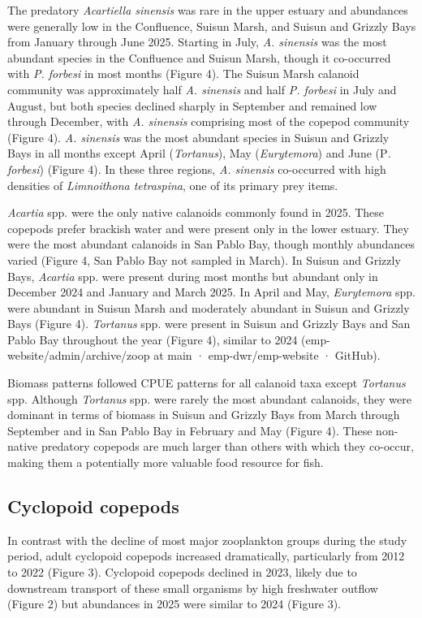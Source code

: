 \documentclass[
  letterpaper,
]{article}
\begin{document}
The predatory \emph{Acartiella sinensis} was rare in the upper estuary
and abundances were generally low in the Confluence, Suisun Marsh, and
Suisun and Grizzly Bays from January through June 2025. Starting in
July, \emph{A. sinensis} was the most abundant species in the Confluence
and Suisun Marsh, though it co-occurred with \emph{P. forbesi} in most
months (Figure 4). The Suisun Marsh calanoid community was approximately
half \emph{A. sinensis} and half \emph{P. forbesi} in July and August,
but both species declined sharply in September and remained low through
December, with \emph{A. sinensis} comprising most of the copepod
community (Figure 4). \emph{A. sinensis} was the most abundant species
in Suisun and Grizzly Bays in all months except April (\emph{Tortanus}),
May (\emph{Eurytemora}) and June (P\emph{. forbesi}) (Figure 4). In
these three regions, \emph{A. sinensis} co-occurred with high densities
of \emph{Limnoithona tetraspina}, one of its primary prey items.

\emph{Acartia} spp. were the only native calanoids commonly found in
2025. These copepods prefer brackish water and were present only in the
lower estuary. They were the most abundant calanoids in San Pablo Bay,
though monthly abundances varied (Figure 4, San Pablo Bay not sampled in
March). In Suisun and Grizzly Bays, \emph{Acartia} spp. were present
during most months but abundant only in December 2024 and January and
March 2025. In April and May, \emph{Eurytemora} spp. were abundant in
Suisun Marsh and moderately abundant in Suisun and Grizzly Bays (Figure
4). \emph{Tortanus} spp. were present in Suisun and Grizzly Bays and San
Pablo Bay throughout the year (Figure 4), similar to 2024
(emp-website/admin/archive/zoop at main · emp-dwr/emp-website · GitHub).

Biomass patterns followed CPUE patterns for all calanoid taxa except
\emph{Tortanus} spp. Although \emph{Tortanus} spp. were rarely the most
abundant calanoids, they were dominant in terms of biomass in Suisun and
Grizzly Bays from March through September and in San Pablo Bay in
February and May (Figure 4). These non-native predatory copepods are
much larger than others with which they co-occur, making them a
potentially more valuable food resource for fish.

\subsection{Cyclopoid copepods}\label{cyclopoid-copepods}

In contrast with the decline of most major zooplankton groups during the
study period, adult cyclopoid copepods increased dramatically,
particularly from 2012 to 2022 (Figure 3). Cyclopoid copepods declined
in 2023, likely due to downstream transport of these small organisms by
high freshwater outflow (Figure 2) but abundances in 2025 were similar
to 2024 (Figure 3).
\end{document}
